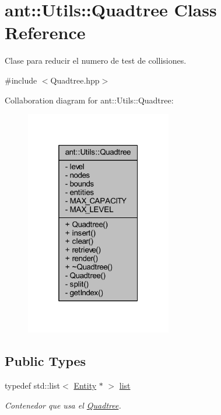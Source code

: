 \hypertarget{classant_1_1_utils_1_1_quadtree}{\section{ant\+:\+:Utils\+:\+:Quadtree Class Reference}
\label{classant_1_1_utils_1_1_quadtree}
}


Clase para reducir el numero de test de collisiones.  




{\ttfamily \#include $<$Quadtree.\+hpp$>$}



Collaboration diagram for ant\+:\+:Utils\+:\+:Quadtree\+:
\nopagebreak
\begin{figure}[H]
\begin{center}
\leavevmode
\includegraphics[width=181pt]{d0/d1a/classant_1_1_utils_1_1_quadtree__coll__graph}
\end{center}
\end{figure}
\subsection*{Public Types}
\begin{DoxyCompactItemize}
\item 
typedef std\+::list$<$ \hyperlink{classant_1_1_entity}{Entity} $\ast$ $>$ \hyperlink{classant_1_1_utils_1_1_quadtree_a744668597e9815bc6cdeb44a48f527dd}{list}
\begin{DoxyCompactList}\small\item\em Contenedor que usa el \hyperlink{classant_1_1_utils_1_1_quadtree}{Quadtree}. \end{DoxyCompactList}\end{DoxyCompactItemize}
